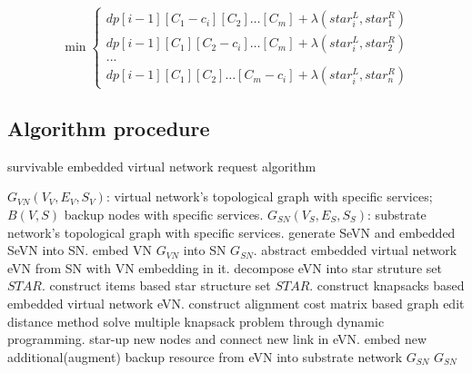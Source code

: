 \begin{equation}
\label{equ:statetransferequation}
\min \left\{ \begin{array}{l}
dp[i - 1][{C_1-c_i}][{C_2}] \ldots [{C_m}]+\lambda(star^L_i,star^R_1)\\
dp[i - 1][{C_1}][{C_2-c_i}] \ldots [{C_m}]+\lambda(star^L_i,star^R_2)\\
...\\
dp[i - 1][{C_1}][{C_2}] \ldots [{C_m-c_i}]+\lambda(star^L_i,star^R_n)
\end{array} \right.
\end{equation}



\subsection{Algorithm procedure}

\begin{algorithm}
\caption{survivable embedded virtual network request algorithm}
\label{alg:SeVNAlg}
\begin{algorithmic}[1]
\REQUIRE $G_{VN}(V_V,E_V,S_V)$: virtual network's topological graph with specific services; $B(V,S)$ backup nodes with specific services. $G_{SN}(V_S,E_S,S_S)$: substrate network's topological graph with specific services.
\ENSURE generate SeVN and embedded SeVN into SN.
\STATE embed VN $G_{VN}$ into SN $G_{SN}$.
\STATE abstract embedded virtual network eVN from SN with VN embedding in it.
\STATE decompose eVN into star struture set $STAR$.
\STATE construct items based star structure set $STAR$.
\STATE construct knapsacks based embedded virtual network eVN.
\STATE construct alignment cost matrix based graph edit distance method\cite{sanfeliu1983distance}
\STATE solve multiple knapsack problem through dynamic programming.
\STATE star-up new nodes and connect new link in eVN.
\STATE embed new additional(augment) backup resource from eVN into substrate network $G_{SN}$
\ENDFOR
\RETURN $G_{SN}$
\end{algorithmic}
\end{algorithm}





